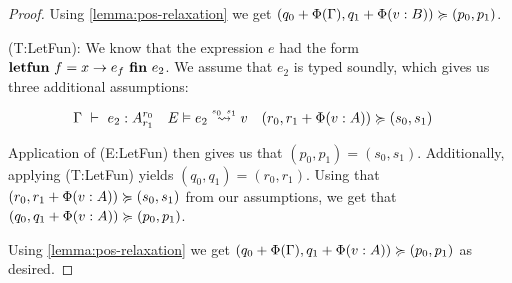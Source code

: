 \begin{proof}
   Using \cref{lemma:pos-relaxation} we get \((q_0 + \Phi(\Gamma), q_1 + \Phi(v : B)) \succcurlyeq (p_0, p_1)\).

   (T:LetFun): We know that the expression \(e\) had the form \(\textbf{letfun}~f = x \to e_f~\textbf{fin}~e_2\). We assume that \(e_2\) is typed soundly, which gives us three additional assumptions:

   \begin{align*}
      & \typing{\Gamma}{e_2}{\ratype{A}{r_0}{r_1}} & \evals{E}{e_2}{v}{s_0}{s_1} & & (r_0, r_1 + \Phi(v : A)) \relaxation (s_0, s_1) &
   \end{align*}

   Application of (E:LetFun) then gives us that \((p_0, p_1) = (s_0, s_1)\). Additionally, applying (T:LetFun) yields \((q_0, q_1) = (r_0, r_1)\). Using that \((r_0, r_1 + \Phi(v : A)) \succcurlyeq (s_0, s_1)\) from our assumptions, we get that \((q_0, q_1 + \Phi(v : A)) \succcurlyeq (p_0, p_1)\). 

   Using \cref{lemma:pos-relaxation} we get \((q_0 + \Phi(\Gamma), q_1 + \Phi(v : A)) \succcurlyeq (p_0, p_1)\) as desired.

\end{proof}
 
